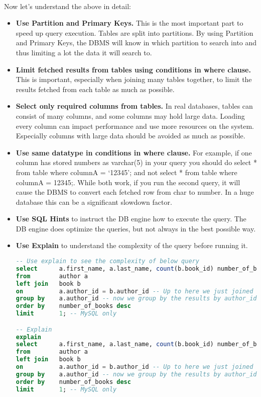\paragraph{} Now let's understand the above in detail:
\begin{itemize}
	\item \textbf{Use Partition and Primary Keys.} This is the most important part to speed up query execution. Tables are split into partitions. By using Partition and Primary Keys, the \acs{DBMS} will know in which partition to search into and thus limiting a lot the data it will search to.
	\item \textbf{Limit fetched results from tables using conditions in where clause.} This is important, especially when joining many tables together, to limit the results fetched from each table as much as possible.
	\item \textbf{Select only required columns from tables.} In real databases, tables can consist of many columns, and some columns may hold large data. Loading every column can impact performance and use more resources on the system. Especially columns with large data should be avoided as much as possible.
	\item \textbf{Use same datatype in conditions in where clause.} For example, if one column has stored numbers as varchar(5) in your query you should do select * from table where columnA = \lq12345\rq; and not select * from table where columnA = 12345;. While both work, if you run the second query, it will cause the DBMS to convert each fetched row from char to number. In a huge database this can be a significant slowdown factor.
	\item \textbf{Use SQL Hints} to instruct the \acs{DB} engine how to execute the query. The \acs{DB} engine does optimize the queries, but not always in the best possible way.
	\item \textbf{Use Explain} to understand the complexity of the query before running it.
	\begin{lstlisting}[language=SQL]
-- Use explain to see the complexity of below query
select		a.first_name, a.last_name, count(b.book_id) number_of_books -- print only first, last name and number of books
from		author a
left join	book b
on			a.author_id = b.author_id -- Up to here we just joined the all authors with their books
group by	a.author_id -- now we group by the results by author_id
order by	number_of_books desc
limit		1; -- MySQL only

-- Explain
explain
select		a.first_name, a.last_name, count(b.book_id) number_of_books -- print only first, last name and number of books
from		author a
left join	book b
on			a.author_id = b.author_id -- Up to here we just joined the all authors with their books
group by	a.author_id -- now we group by the results by author_id
order by	number_of_books desc
limit		1; -- MySQL only
	\end{lstlisting}
\end{itemize}
